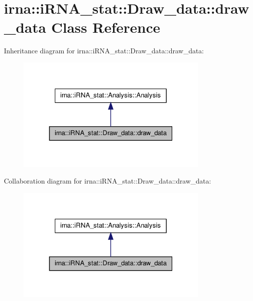 \hypertarget{classirna_1_1iRNA__stat_1_1Draw__data_1_1draw__data}{
\section{irna\-:\-:i\-R\-N\-A\-\_\-stat\-:\-:\-Draw\-\_\-data\-:\-:draw\-\_\-data \-Class \-Reference}
\label{classirna_1_1iRNA__stat_1_1Draw__data_1_1draw__data}
}


\-Inheritance diagram for irna\-:\-:i\-R\-N\-A\-\_\-stat\-:\-:\-Draw\-\_\-data\-:\-:draw\-\_\-data\-:\nopagebreak
\begin{figure}[H]
\begin{center}
\leavevmode
\includegraphics[width=268pt]{classirna_1_1iRNA__stat_1_1Draw__data_1_1draw__data__inherit__graph}
\end{center}
\end{figure}


\-Collaboration diagram for irna\-:\-:i\-R\-N\-A\-\_\-stat\-:\-:\-Draw\-\_\-data\-:\-:draw\-\_\-data\-:\nopagebreak
\begin{figure}[H]
\begin{center}
\leavevmode
\includegraphics[width=268pt]{classirna_1_1iRNA__stat_1_1Draw__data_1_1draw__data__coll__graph}
\end{center}
\end{figure}
